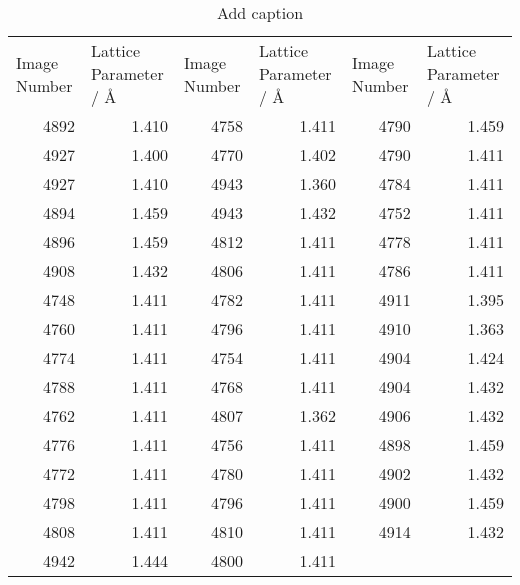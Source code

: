 \begin{table}[htbp]
    \centering
    \caption{Add caption}
      \begin{tabular}{|rr|rr|rr|}
      \toprule
      \multicolumn{1}{|l}{Image Number} & \multicolumn{1}{l|}{Lattice Parameter / Å} & \multicolumn{1}{l}{Image Number} & \multicolumn{1}{l|}{Lattice Parameter / Å} & \multicolumn{1}{l}{Image Number} & \multicolumn{1}{l|}{Lattice Parameter / Å} \\
      4892  & 1.410 & 4758  & 1.411 & 4790  & 1.459 \\
      4927  & 1.400 & 4770  & 1.402 & 4790  & 1.411 \\
      4927  & 1.410 & 4943  & 1.360 & 4784  & 1.411 \\
      4894  & 1.459 & 4943  & 1.432 & 4752  & 1.411 \\
      4896  & 1.459 & 4812  & 1.411 & 4778  & 1.411 \\
      4908  & 1.432 & 4806  & 1.411 & 4786  & 1.411 \\
      4748  & 1.411 & 4782  & 1.411 & 4911  & 1.395 \\
      4760  & 1.411 & 4796  & 1.411 & 4910  & 1.363 \\
      4774  & 1.411 & 4754  & 1.411 & 4904  & 1.424 \\
      4788  & 1.411 & 4768  & 1.411 & 4904  & 1.432 \\
      4762  & 1.411 & 4807  & 1.362 & 4906  & 1.432 \\
      4776  & 1.411 & 4756  & 1.411 & 4898  & 1.459 \\
      4772  & 1.411 & 4780  & 1.411 & 4902  & 1.432 \\
      4798  & 1.411 & 4796  & 1.411 & 4900  & 1.459 \\
      4808  & 1.411 & 4810  & 1.411 & 4914  & 1.432 \\
      4942  & 1.444 & 4800  & 1.411 &       &  \\
      \bottomrule
      \end{tabular}%
    \label{tab:addlabel}%
  \end{table}%